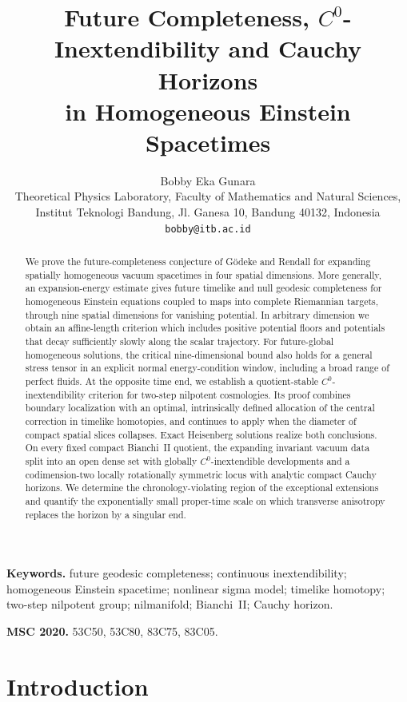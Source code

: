 \documentclass[10pt,a4paper]{article}
\title{Future Completeness, $C^0$-Inextendibility and Cauchy Horizons\\
in Homogeneous Einstein Spacetimes}
\author{Bobby Eka Gunara\\[2mm]
\small Theoretical Physics Laboratory, Faculty of Mathematics and Natural Sciences,\\
\small Institut Teknologi Bandung, Jl. Ganesa 10, Bandung 40132, Indonesia\\
\small \texttt{bobby@itb.ac.id}}
\date{}
\numberwithin{equation}{section}
\theoremstyle{definition}
\theoremstyle{remark}
\begin{document}
\maketitle

\begin{abstract}
We prove the future-completeness conjecture of G\"odeke and Rendall for
expanding spatially homogeneous vacuum spacetimes in four spatial
dimensions.  More generally, an expansion-energy estimate gives future
timelike and null geodesic completeness for homogeneous Einstein equations
coupled to maps into complete Riemannian targets, through nine spatial
dimensions for vanishing potential.  In arbitrary dimension we obtain an
affine-length criterion which includes positive potential floors and
potentials that decay sufficiently slowly along the scalar trajectory.
For future-global homogeneous solutions, the critical nine-dimensional
bound also holds for a general stress tensor in an explicit normal
energy-condition window, including a broad range of perfect fluids.
At the opposite time end, we establish a quotient-stable
$C^0$-inextendibility criterion for two-step nilpotent cosmologies.  Its
proof combines boundary localization with an optimal, intrinsically
defined allocation of the central correction in timelike homotopies, and
continues to apply when the diameter of compact spatial slices collapses.
Exact Heisenberg solutions realize both conclusions.  On every fixed
compact Bianchi~II quotient, the expanding invariant vacuum data split
into an open dense set with globally $C^0$-inextendible developments and
a codimension-two locally rotationally symmetric locus with analytic
compact Cauchy horizons.  We determine the chronology-violating region of
the exceptional extensions and quantify the exponentially small
proper-time scale on which transverse anisotropy replaces the horizon by
a singular end.
\end{abstract}

\noindent\textbf{Keywords.} future geodesic completeness; continuous
inextendibility; homogeneous Einstein spacetime; nonlinear sigma model;
timelike homotopy; two-step nilpotent group; nilmanifold; Bianchi~II;
Cauchy horizon.

\medskip
\noindent\textbf{MSC 2020.} 53C50, 53C80, 83C75, 83C05.

\tableofcontents

\section{Introduction}
\end{document}
